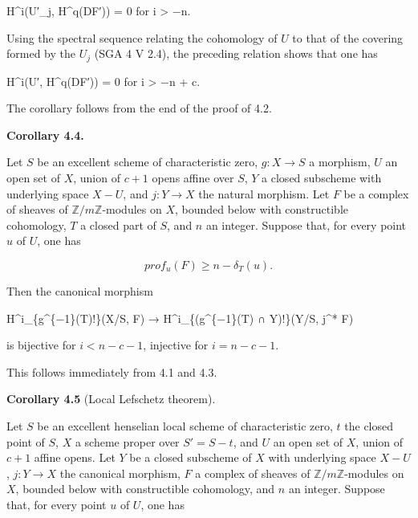 \documentclass[
]{article}
\newenvironment{Shaded}{}{}
\newcommand{\NormalTok}[1]{#1}
\begin{document}
\begin{Shaded}
\begin{Highlighting}[]
\NormalTok{H\^{}i(U′\_j, H\^{}q(DF′)) = 0 for i \textgreater{} −n.}
\end{Highlighting}
\end{Shaded}

Using the spectral sequence relating the cohomology of \(U\) to that of
the covering formed by the \(U_{j}\) (SGA 4 V 2.4), the preceding
relation shows that one has

\begin{Shaded}
\begin{Highlighting}[]
\NormalTok{H\^{}i(U′, H\^{}q(DF′)) = 0 for i \textgreater{} −n + c.}
\end{Highlighting}
\end{Shaded}

The corollary follows from the end of the proof of 4.2.

\textbf{Corollary 4.4.}

Let \(S\) be an excellent scheme of characteristic zero, \(g : X \to S\)
a morphism, \(U\) an open set of \(X\), union of \(c + 1\) opens affine
over \(S\), \(Y\) a closed subscheme with underlying space \(X - U\),
and \(j : Y \to X\) the natural morphism. Let \(F\) be a complex of
sheaves of \(\mathbb{Z}/m\mathbb{Z}\)-modules on \(X\), bounded below
with constructible cohomology, \(T\) a closed part of \(S\), and \(n\)
an integer. Suppose that, for every point \(u\) of \(U\), one has

\[
prof_{u}(F) \geqslant n - \delta_{T}(u).
\]

Then the canonical morphism

\begin{Shaded}
\begin{Highlighting}[]
\NormalTok{H\^{}i\_\{g\^{}\{−1\}(T)!\}(X/S, F) → H\^{}i\_\{(g\^{}\{−1\}(T) ∩ Y)!\}(Y/S, j\^{}* F)}
\end{Highlighting}
\end{Shaded}

is bijective for \(i < n - c - 1\), injective for \(i = n - c - 1\).

This follows immediately from 4.1 and 4.3.

\textbf{Corollary 4.5} (Local Lefschetz theorem).

Let \(S\) be an excellent henselian local scheme of characteristic zero,
\(t\) the closed point of \(S\), \(X\) a scheme proper over
\(S' = S - {t}\), and \(U\) an open set of \(X\), union of \(c + 1\)
affine opens. Let \(Y\) be a closed subscheme of \(X\) with underlying
space \(X - U\), \(j : Y \to X\) the canonical morphism, \(F\) a complex
of sheaves of \(\mathbb{Z}/m\mathbb{Z}\)-modules on \(X\), bounded below
with constructible cohomology, and \(n\) an integer. Suppose that, for
every point \(u\) of \(U\), one has
\end{document}
